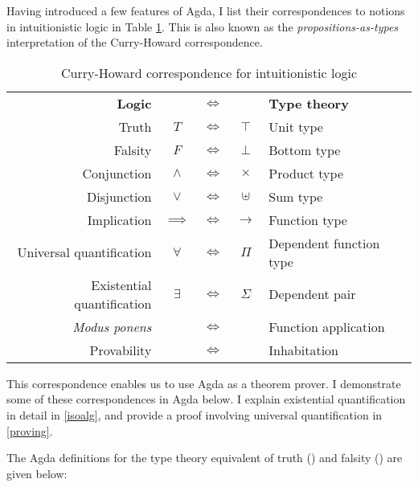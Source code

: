 \documentclass[12pt,a4paper,twoside,openright]{report}
\newcommand{\F}{\AgdaFunction}
\begin{document}
Having introduced a few features of Agda, I list their correspondences to notions in intuitionistic logic in Table \ref{tab:curry}. This is also known as the \emph{propositions-as-types} interpretation of the Curry-Howard correspondence.

\begin{table}[t]
\begin{center}
\begin{tabular}{ r c c c l }
\hline
{\bf Logic} &&$\iff$&& {\bf Type theory} \\
Truth  &$T$&$\iff$&$\top$& Unit type  \\
Falsity  &$F$&$\iff$&$\bot$& Bottom type  \\
Conjunction &$\land$&$\iff$&$\times$& Product type \\
Disjunction &$\lor$&$\iff$&$\uplus$& Sum type \\
Implication &$\implies$&$\iff$&$\to$& Function type \\
Universal quantification &$\forall$&$\iff$&$\Pi$& Dependent function type \qquad \qquad \\
\qquad Existential quantification &$\exists$&$\iff$&$\Sigma$& Dependent pair\\
{\it Modus ponens} &&$\iff$&& Function application \\
Provability &&$\iff$&& Inhabitation \\
\hline
\end{tabular}
\end{center}
\caption{Curry-Howard correspondence for intuitionistic logic}
\label{tab:curry}
\end{table}

This correspondence enables us to use Agda as a theorem prover. I demonstrate some of these correspondences in Agda below. I explain existential quantification in detail in \autoref{isoalg}, and provide a proof involving universal quantification in \autoref{proving}.

The Agda definitions for the type theory equivalent of truth (\F{$\top$}) and falsity (\F{$\bot$}) are given below:

\begin{code}
\>  \AgdaSymbol{:}  \<%
\\
\>[0]\<[2]%
\>[2] \AgdaSymbol{:} \<%
\\
%
\\
\>  \AgdaSymbol{:}  \<%
\end{code}
\end{document}
